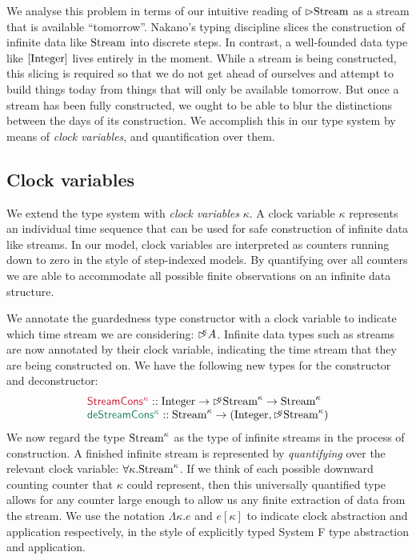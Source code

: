 We analyse this problem in terms of our intuitive reading of
$\rhd\textrm{Stream}$ as a stream that is available
``tomorrow''. Nakano's typing discipline slices the construction of
infinite data like $\textrm{Stream}$ into discrete steps. In contrast,
a well-founded data type like $[\textrm{Integer}]$ lives entirely in
the moment. While a stream is being constructed, this slicing is
required so that we do not get ahead of ourselves and attempt to build
things today from things that will only be available tomorrow. But
once a stream has been fully constructed, we ought to be able to blur
the distinctions between the days of its construction. We accomplish
this in our type system by means of \emph{clock variables}, and
quantification over them.

\subsection{Clock variables}
\label{sec:clock-vars}

We extend the type system with \emph{clock variables} $\kappa$. A
clock variable $\kappa$ represents an individual time sequence that
can be used for safe construction of infinite data like streams. In
our model, clock variables are interpreted as counters running down to
zero in the style of step-indexed models. By quantifying over all
counters we are able to accommodate all possible finite observations
on an infinite data structure.

We annotate the guardedness type constructor with a clock variable to
indicate which time stream we are considering: $\mathord{\rhd\kern-0.4em^{\kappa}}
A$. Infinite data types such as streams are now annotated by their
clock variable, indicating the time stream that they are being
constructed on. We have the following new types for the constructor
and deconstructor:
\begin{displaymath}
  \begin{array}{l}
    \cons{StreamCons$^\kappa$} :: \tyname{Integer} \to \delay\kappa \tyname{Stream}^\kappa \to \tyname{Stream}^\kappa \\
    \elim{deStreamCons$^\kappa$} :: \tyname{Stream}^\kappa \to (\tyname{Integer}, \delay\kappa\tyname{Stream}^\kappa)    
  \end{array}
\end{displaymath}
We now regard the type $\textrm{Stream}^\kappa$ as the type of
infinite streams in the process of construction. A finished infinite
stream is represented by \emph{quantifying} over the relevant clock
variable: $\forall \kappa. \textrm{Stream}^\kappa$. If we think of
each possible downward counting counter that $\kappa$ could represent,
then this universally quantified type allows for any counter large
enough to allow us any finite extraction of data from the stream. We
use the notation $\Lambda\kappa. e$ and $e[\kappa]$ to indicate clock
abstraction and application respectively, in the style of explicitly
typed System F type abstraction and application.

